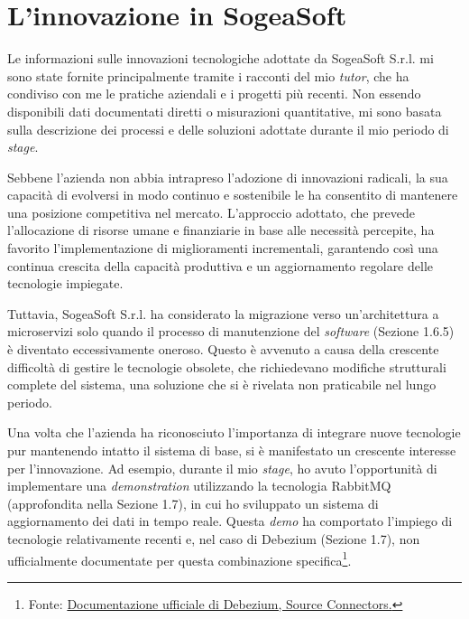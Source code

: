    \section{L’innovazione in SogeaSoft}

    Le informazioni sulle innovazioni tecnologiche adottate da SogeaSoft S.r.l. mi sono state fornite principalmente tramite i racconti del mio \textit{tutor}, che ha condiviso con me le pratiche aziendali e i progetti più recenti. Non essendo disponibili dati documentati diretti o misurazioni quantitative, mi sono basata sulla descrizione dei processi e delle soluzioni adottate durante il mio periodo di \textit{stage}.

    \vspace{0.5 em}
    \noindent Sebbene l'azienda non abbia intrapreso l'adozione di innovazioni radicali, la sua capacità di evolversi in modo continuo e sostenibile le ha consentito di mantenere una posizione competitiva nel mercato. L'approccio adottato, che prevede l'allocazione di risorse umane e finanziarie in base alle necessità percepite, ha favorito l'implementazione di miglioramenti incrementali, garantendo così una continua crescita della capacità produttiva e un aggiornamento regolare delle tecnologie impiegate.
    
    \vspace{0.5 em}
    \noindent Tuttavia, SogeaSoft S.r.l. ha considerato la migrazione verso un'architettura a microservizi solo quando il processo di manutenzione del \textit{software} (Sezione 1.6.5) è diventato eccessivamente oneroso. Questo è avvenuto a causa della crescente difficoltà di gestire le tecnologie obsolete, che richiedevano modifiche strutturali complete del sistema, una soluzione che si è rivelata non praticabile nel lungo periodo. 

    \vspace{0.5 em}
    \noindent Una volta che l'azienda ha riconosciuto l'importanza di integrare nuove tecnologie pur mantenendo intatto il sistema di base, si è manifestato un crescente interesse per l'innovazione. Ad esempio, durante il mio \textit{stage}, ho avuto l'opportunità di implementare una \textit{demonstration} utilizzando la tecnologia RabbitMQ (approfondita nella Sezione 1.7), in cui ho sviluppato un sistema di aggiornamento dei dati in tempo reale. Questa \textit{demo} ha comportato l'impiego di tecnologie relativamente recenti e, nel caso di Debezium (Sezione 1.7), non ufficialmente documentate per questa combinazione specifica\footnote{Fonte: \href{https://debezium.io/documentation/reference/3.1/connectors/index.html}{Documentazione ufficiale di Debezium, Source Connectors.}}. 

